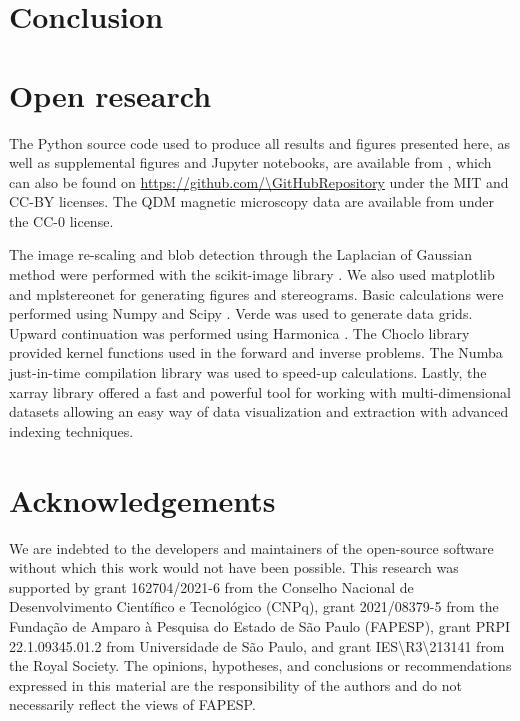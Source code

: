 \section{Conclusion}



\section{Open research}

The Python source code used to produce all results and figures presented here, as well as supplemental figures and Jupyter notebooks, are available from \citet{sourcearchive}, which can also be found on \url{https://github.com/\GitHubRepository} under the MIT and CC-BY licenses.
The QDM magnetic microscopy data are available
from \citet{janinedata} under the CC-0 license.

The image re-scaling and blob detection through the Laplacian of Gaussian
method were performed with the scikit-image library \citep{VanderWalt2014}.
We also used matplotlib \citep{Hunter2007} and mplstereonet \citep{mplstereonet}
for generating figures and stereograms.
Basic calculations were performed using Numpy \citep{Harris2020} and Scipy
\citep{2020SciPy-NMeth}.
Verde \citep{verde2018} was used to generate data grids.
Upward continuation was performed using Harmonica \citep{harmonica2020}.
The Choclo library \citep{choclo2022} provided kernel functions used in the
forward and inverse problems.
The Numba just-in-time compilation library \citep{lam2015numba} was used to
speed-up calculations.
Lastly, the xarray library \citep{hoyer2017xarray} offered a fast and powerful
tool for working with multi-dimensional datasets allowing an easy way of data
visualization and extraction with advanced indexing techniques.



\section{Acknowledgements}

We are indebted to the developers and maintainers of the open-source software
without which this work would not have been possible.
This research was supported by
grant 162704/2021-6 from the Conselho Nacional de Desenvolvimento Científico e Tecnológico (CNPq),
grant 2021/08379-5 from the Fundação de Amparo à Pesquisa do Estado de São Paulo (FAPESP),
grant PRPI 22.1.09345.01.2 from Universidade de São Paulo,
and grant IES\textbackslash{}R3\textbackslash{}213141 from the Royal Society.
The opinions, hypotheses, and conclusions or recommendations expressed in this
material are the responsibility of the authors and do not necessarily reflect
the views of FAPESP.
